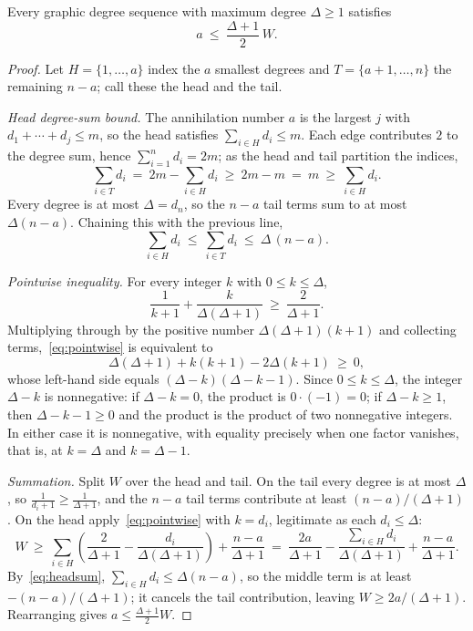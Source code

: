 \documentclass[10pt,a4paper]{amsart}
\begin{document}
\begin{theorem}\label{thm:vehicle}
Every graphic degree sequence with maximum degree $\Delta \ge 1$ satisfies
\[
  a \ \le\ \frac{\Delta+1}{2}\, W.
\]
\end{theorem}

\begin{proof}
Let $H = \{1, \ldots, a\}$ index the $a$ smallest degrees and
$T = \{a+1, \ldots, n\}$ the remaining $n-a$; call these the head and the tail.

\medskip\noindent\emph{Head degree-sum bound.}
The annihilation number $a$ is the largest $j$ with $d_1 + \cdots + d_j \le m$, so
the head satisfies $\sum_{i \in H} d_i \le m$. Each edge contributes $2$ to the
degree sum, hence $\sum_{i=1}^{n} d_i = 2m$; as the head and tail partition the
indices,
\[
  \sum_{i \in T} d_i \ =\ 2m - \sum_{i \in H} d_i \ \ge\ 2m - m \ =\ m
    \ \ge\ \sum_{i \in H} d_i .
\]
Every degree is at most $\Delta = d_n$, so the $n-a$ tail terms sum to at most
$\Delta(n-a)$. Chaining this with the previous line,
\begin{equation}\label{eq:headsum}
  \sum_{i \in H} d_i \ \le\ \sum_{i \in T} d_i \ \le\ \Delta\,(n-a).
\end{equation}

\medskip\noindent\emph{Pointwise inequality.}
For every integer $k$ with $0 \le k \le \Delta$,
\begin{equation}\label{eq:pointwise}
  \frac{1}{k+1} + \frac{k}{\Delta(\Delta+1)} \ \ge\ \frac{2}{\Delta+1}.
\end{equation}
Multiplying through by the positive number $\Delta(\Delta+1)(k+1)$ and collecting
terms,~\eqref{eq:pointwise} is equivalent to
\[
  \Delta(\Delta+1) + k(k+1) - 2\Delta(k+1) \ \ge\ 0,
\]
whose left-hand side equals $(\Delta-k)(\Delta-k-1)$. Since $0 \le k \le \Delta$,
the integer $\Delta - k$ is nonnegative: if $\Delta - k = 0$, the product is
$0 \cdot (-1) = 0$; if $\Delta - k \ge 1$, then $\Delta - k - 1 \ge 0$ and the
product is the product of two nonnegative integers. In either case it is
nonnegative, with equality precisely when one factor vanishes, that is, at
$k = \Delta$ and $k = \Delta - 1$.

\medskip\noindent\emph{Summation.}
Split $W$ over the head and tail. On the tail every degree is at most $\Delta$, so
$\tfrac{1}{d_i+1} \ge \tfrac{1}{\Delta+1}$, and the $n-a$ tail terms contribute at
least $(n-a)/(\Delta+1)$. On the head apply~\eqref{eq:pointwise} with $k = d_i$,
legitimate as each $d_i \le \Delta$:
\[
  W \ \ge\ \sum_{i \in H}\!\left(\frac{2}{\Delta+1} - \frac{d_i}{\Delta(\Delta+1)}\right)
        + \frac{n-a}{\Delta+1}
    \ =\ \frac{2a}{\Delta+1}
        - \frac{\sum_{i \in H} d_i}{\Delta(\Delta+1)}
        + \frac{n-a}{\Delta+1}.
\]
By~\eqref{eq:headsum}, $\sum_{i \in H} d_i \le \Delta(n-a)$, so the middle term is
at least $-(n-a)/(\Delta+1)$; it cancels the tail contribution, leaving
$W \ge 2a/(\Delta+1)$. Rearranging gives $a \le \tfrac{\Delta+1}{2}W$.
\end{proof}
\end{document}
